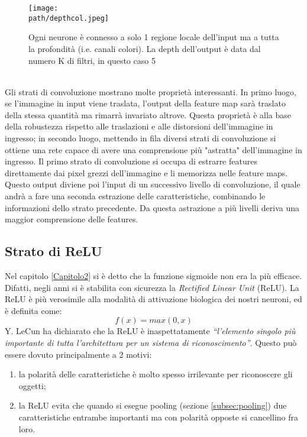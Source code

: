 \begin{figure}[h!]
 \centering
 \texttt{[image: \\path/depthcol.jpeg]} 
 \caption{Ogni neurone è connesso a solo 1 regione locale dell'input ma a tutta la profondità (i.e. canali colori). La depth dell'output è data dal numero K di filtri, in questo caso 5}
 \label{fig:depth}
\end{figure}\\
Gli strati di convoluzione mostrano molte proprietà interessanti.
In primo luogo, se l'immagine in input viene traslata, l'output della feature map sarà traslato della stessa quantità ma rimarrà invariato altrove. Questa proprietà è alla base della robustezza rispetto alle traslazioni e alle distorsioni dell'immagine in ingresso; in secondo luogo, mettendo in fila diversi strati di convoluzione si ottiene una rete capace di avere una comprensione più "astratta" dell'immagine in ingresso. Il primo strato di convoluzione si occupa di estrarre features direttamente dai pixel grezzi dell'immagine e li memorizza nelle feature maps. Questo output diviene poi l'input di un successivo livello di convoluzione, il quale andrà a fare una seconda estrazione delle caratteristiche, combinando le informazioni dello strato precedente. Da questa astrazione a più livelli deriva una maggior comprensione delle features. \\
\subsection{Strato di ReLU}
Nel capitolo \ref{Capitolo2} si è detto che la funzione sigmoide non era la più efficace. Difatti, negli anni si è stabilita con sicurezza la \emph{Rectified Linear Unit} (ReLU). La ReLU è più verosimile alla modalità di attivazione biologica dei nostri neuroni\parencite{Relu}, ed è definita come: 
$$
f(x) = max(0,x)
$$ 
Y. LeCun ha dichiarato che la ReLU è inaspettatamente \emph{“l'elemento
singolo più importante di tutta l'architettura per un sistema di riconoscimento”}. Questo può essere dovuto principalmente a 2 motivi:
\begin{enumerate}
\item la polarità delle caratteristiche è molto spesso irrilevante per riconoscere gli oggetti;
\item la ReLU evita che quando si esegue pooling (sezione \ref{subsec:pooling}) due caratteristiche entrambe importanti ma con polarità opposte si cancellino fra loro.
\end{enumerate}
